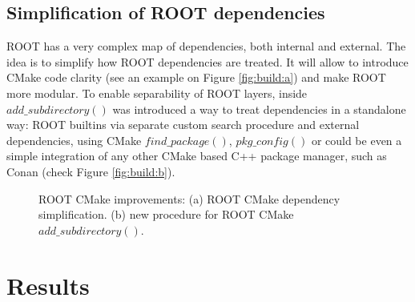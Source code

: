 \documentclass[12pt]{iopart}
\begin{document}
\subsection{Simplification of ROOT dependencies}

ROOT has a very complex map of dependencies, both internal and external. The idea is to simplify how ROOT dependencies are treated. It will allow to introduce CMake code clarity (see an example on Figure \ref{fig:build:a}) and make ROOT more modular. To enable separability of ROOT layers, inside $add\_subdirectory()$ was introduced a way to treat dependencies in a standalone way: ROOT builtins via separate custom search procedure and external dependencies, using CMake $find\_package()$, $pkg\_config()$ or could be even a simple integration of any other CMake based C++ package manager, such as Conan \cite{conan} (check Figure \ref{fig:build:b}).

\begin{figure}
\centering
\begin{minipage}{\textwidth}
\begin{center}
\end{center}{}
\end{minipage}\hfill
\begin{minipage}{\textwidth}
\begin{center}
\end{center}{}
\end{minipage}
 \caption{ROOT CMake improvements: (a) ROOT CMake dependency simplification. (b) new procedure for ROOT CMake $add\_subdirectory()$.}
\label{fig:performance1}
\end{figure}

\section{Results}
\end{document}
